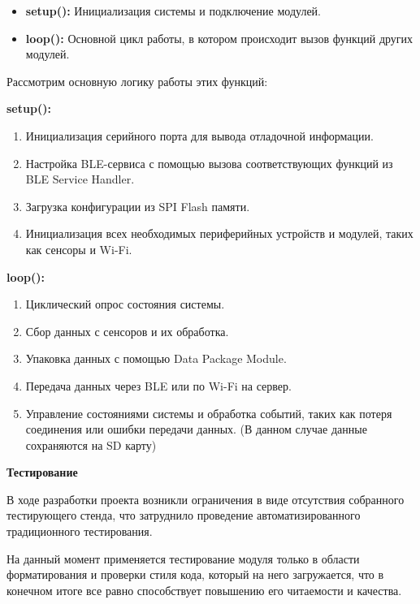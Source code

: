 \documentclass[12pt, russian]{extarticle}
\begin{document}
\begin{spacing}{1.5}
\begin{itemize}
    \item \textbf{setup():} Инициализация системы и подключение модулей.
    \item \textbf{loop():} Основной цикл работы, в котором происходит вызов функций других модулей.
\end{itemize}

Рассмотрим основную логику работы этих функций:

\par \noindent \textbf{setup():}

\begin{enumerate}
    \item Инициализация серийного порта для вывода отладочной информации.
    \item Настройка BLE-сервиса с помощью вызова соответствующих функций из BLE Service Handler.
    \item Загрузка конфигурации из SPI Flash памяти.
    \item Инициализация всех необходимых периферийных устройств и модулей, таких как сенсоры и Wi-Fi.
\end{enumerate}

\par \noindent \textbf{loop():}

\begin{enumerate}
    \item Циклический опрос состояния системы.
    \item Сбор данных с сенсоров и их обработка.
    \item Упаковка данных с помощью Data Package Module.
    \item Передача данных через BLE или по Wi-Fi на сервер.
    \item Управление состояниями системы и обработка событий, таких как потеря соединения или ошибки передачи данных. (В данном случае данные сохраняются на SD карту)
\end{enumerate}

\par \noindent \textbf{Тестирование}

В ходе разработки проекта возникли ограничения в виде отсутствия собранного тестирующего стенда, что затруднило проведение автоматизированного традиционного тестирования.

На данный момент применяется тестирование модуля только в области форматирования и проверки стиля кода, который на него загружается, что в конечном итоге все равно способствует повышению его читаемости и качества.


\end{spacing}
\end{document}
